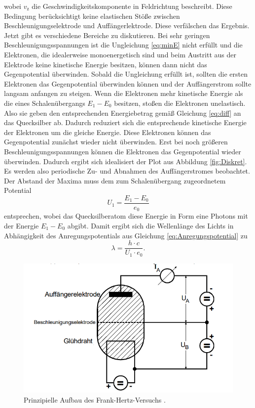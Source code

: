 wobei $v_\text{z}$ die Geschwindigkeitskomponente in Feldrichtung beschreibt. Diese Bedingung
berücksichtigt keine elastischen Stöße zwischen Beschleunigungselektrode und Auffängerlektrode. Diese verfälschen 
das Ergebnis.\\
Jetzt gibt es verschiedene Bereiche zu diskutieren. Bei sehr geringen Beschleunigungsspannungen
ist die Ungleichung \eqref{eq:minE} nicht erfüllt und die Elektronen, die idealerweise monoenergetisch sind und beim Austritt aus der 
Elektrode keine kinetische Energie besitzen, können dann nicht das Gegenpotential überwinden.
Sobald die Ungleichung erfüllt ist, sollten die ersten Elektronen das Gegenpotential überwinden können und der 
Auffängerstrom sollte langsam anfangen zu steigen.
Wenn die Elektronen mehr kinetische Energie als die eines Schalenübergangs $E_1-E_0$ besitzen, stoßen 
die Elektronen unelastisch. Also sie geben den entsprechenden Energiebetrag gemäß 
Gleichung \eqref{eq:diff} an das Quecksilber ab. Dadurch reduziert sich die entsprechende kinetische Energie 
der Elektronen um die gleiche Energie. Diese Elektronen können das Gegenpotential zunächst wieder nicht 
überwinden. Erst bei noch größeren Beschleunigungsspannungen können die Elektronen das Gegenpotential wieder überwinden.
Dadurch ergibt sich idealisiert der Plot aus Abbildung \ref{fig:Diskret}. Es werden also periodische Zu- und Abnahmen 
des Auffängerstromes beobachtet. Der Abstand der Maxima muss dem zum Schalenübergang zugeordnetem
Potential
\begin{equation}
    U_1=\frac{E_1-E_0}{e_0}
    \label{eq:Anregungspotential}
\end{equation}
entsprechen, wobei das Quecksilberatom diese Energie in Form eine Photons mit der Energie $E_1-E_0$ abgibt.
Damit ergibt sich die Wellenlänge des Lichts in Abhängigkeit des Anregungspotentials aus Gleichung \eqref{eq:Anregungspotential} zu 
\begin{equation}
    \lambda =\frac{h\cdot c}{U_1\cdot e_0}.
    \label{eq:WellenL}
\end{equation}
\begin{figure}[H]
    \centering
    \includegraphics[scale=1]{content/PAufbau.png}
    \caption{Prinzipielle Aufbau des Frank-Hertz-Versuchs \cite{sample}.}
    \label{fig:FH}
\end{figure}

